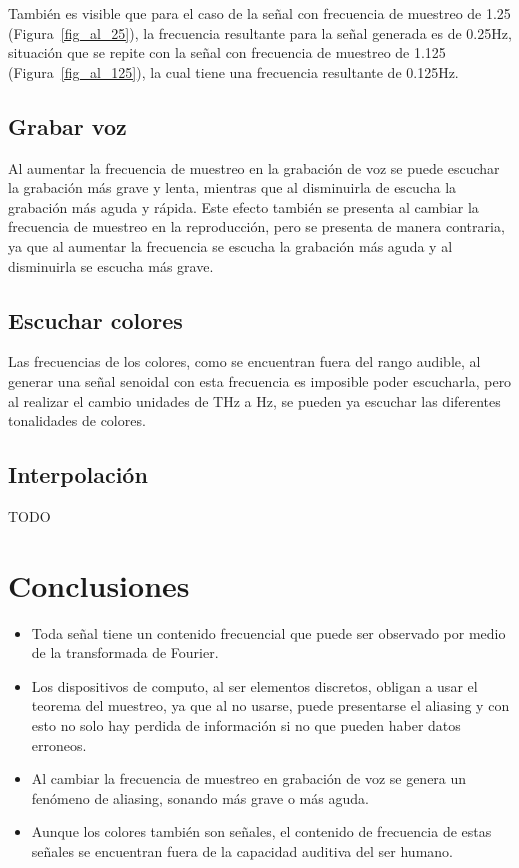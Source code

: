 \documentclass[comsoc, journal]{IEEEtran}
\begin{document}
También es visible que para el caso de la señal con frecuencia de muestreo de 1.25 (Figura~\ref{fig_al_25}), la frecuencia resultante para la señal generada es de 0.25Hz, situación que se repite con la señal con frecuencia de muestreo de 1.125 (Figura~\ref{fig_al_125}), la cual tiene una frecuencia resultante de 0.125Hz.

\subsection{Grabar voz}
Al aumentar la frecuencia de muestreo en la grabación de voz se puede escuchar la grabación más grave y lenta, mientras que al disminuirla de escucha la grabación más aguda y rápida. Este efecto también se presenta al cambiar la frecuencia de muestreo en la reproducción, pero se presenta de manera contraria, ya que al aumentar la frecuencia se escucha la grabación más aguda y al disminuirla se escucha más grave.

\subsection{Escuchar colores}
Las frecuencias de los colores, como se encuentran fuera del rango audible, al generar una señal senoidal con esta frecuencia es imposible poder escucharla, pero al realizar el cambio unidades de THz a Hz, se pueden ya escuchar las diferentes tonalidades de colores.

\subsection{Interpolación}
TODO

\section{Conclusiones}
\begin{itemize}
    \item Toda señal tiene un contenido frecuencial que puede ser observado por medio de la transformada de Fourier.
    \item Los dispositivos de computo, al ser elementos discretos, obligan a usar el teorema del muestreo, ya que al no usarse, puede presentarse el aliasing y con esto no solo hay perdida de información si no que pueden haber datos erroneos.
    \item Al cambiar la frecuencia de muestreo en grabación de voz se genera un fenómeno de aliasing, sonando más grave o más aguda.
    \item Aunque los colores también son señales, el contenido de frecuencia de estas señales se encuentran fuera de la capacidad auditiva del ser humano.
\end{itemize}
\end{document}
